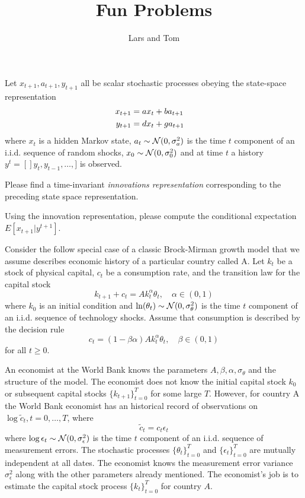 \documentclass{article} %
\title{Fun Problems}
\author{Lars and Tom} %
\begin{document}
\maketitle


\medskip

 \quad Let $x_{t+1}, a_{t+1}, y_{t+1}$ all be scalar stochastic processes obeying the 
state-space representation
\begin{align*}
     x_{t+1} & = a x_t + b a_{t+1} \cr
            y_{t+1} & = d x_t + g a_{t+1} \end{align*}
where $x_t$ is a hidden Markov state, $a_t \sim {\cal N}(0, \sigma_a^2)$ is the time $t$ component
of an i.i.d. sequence of random shocks, $x_0 \sim {\cal N}(0, \sigma_0^2)$
 and at time $t$ a history $y^t =[] y_t, y_{t-1}, \ldots, ]$ is observed.  

\medskip
{} Please find a time-invariant {\it innovations representation\/} corresponding to the preceding state
space representation.  

\medskip
{} Using the innovation representation,  please compute the conditional
expectation $E [x_{t+1} | y^{t+1}]$. 

\medskip


 \quad Consider the follow special case of a classic Brock-Mirman growth model that 
we assume describes economic history of a particular country called A.
Let $k_t$ be a stock of physical capital, $c_t$ be a consumption rate, and the transition law for the capital 
stock 
$$ k_{t+1} + c_t = A k_t^\alpha \theta_t, \quad \alpha \in (0,1) $$
where $k_0$ is an initial condition and $\ln (\theta_t) \sim {\cal N}(0, \sigma_\theta^2)$ is the time $t$
component of an i.i.d. sequence of technology shocks.  Assume that consumption is described by
the decision rule
$$ c_t = (1-\beta \alpha) A k_t^\alpha \theta_t, \quad \beta \in (0,1) $$
for all $t \geq 0$.

An economist at the World Bank knows the parameters $A, \beta, \alpha, \sigma_\theta$ and the structure of
the model.  The economist does not know the initial capital stock $k_0$ or subsequent capital stocks
$\{k_{t+1}\}_{t=0}^T$ for some large $T$.  However, for country A the World Bank economist has an historical record
of observations on $\log \tilde c_t, t=0, \ldots, T$, where 
$$ \tilde c_t = c_t \epsilon_t $$
where $\log \epsilon_t \sim {\cal N}(0, \sigma_\epsilon^2)$ is the time $t$ component of an i.i.d. sequence 
of measurement errors.  The stochastic processes $\{\theta_t\}_{t=0}^T$ and $\{\epsilon_t\}_{t=0}^T$ are mutually
independent at all dates.  The economist knows the measurement error variance $\sigma_\epsilon^2$ along with the 
other parameters already mentioned.  
The economist's job is to  estimate  the capital stock process $\{k_t\}_{t=0}^T$ for country $A$. 
\end{document}
